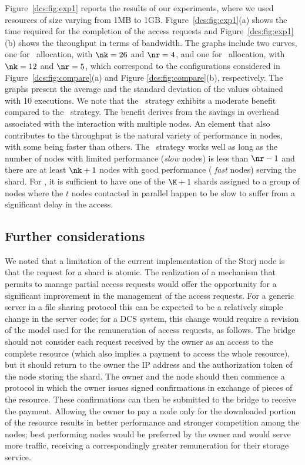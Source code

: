 {Figure~\ref{dcs:fig:exp1} reports the results of our experiments, where we
used resources of size varying from 1MB to 1GB.
Figure~\ref{dcs:fig:exp1}(a) shows the time required for the completion of
the access requests and Figure~\ref{dcs:fig:exp1}(b) shows the throughput
in terms of bandwidth. The graphs include two curves, one for
\diagonal\ allocation, with $\nk=26$ and $\nr=4$, and one for
\compact\ allocation, with $\nk=12$ and $\nr=5$, which correspond to
the configurations considered in Figure~\ref{dcs:fig:compare}(a) and
Figure \ref{dcs:fig:compare}(b), respectively.  The graphs present the
average and the standard deviation of the values obtained with 10
executions. We note that the \compact\ strategy exhibits a moderate
benefit compared to the \diagonal\ strategy. The benefit derives from
the savings in overhead associated with the interaction with multiple
nodes. An element that also contributes to the throughput is the
natural variety of performance in nodes, with some being faster than
others.  The \compact\ strategy works well as long as the number of
nodes with limited performance ({\em slow} nodes) is less than $\nr
-1$ and there are at least $\nk +1$ nodes with good performance ({\em
  fast} nodes) serving the shard. For \diagonal, it is sufficient to
have one of the $\K+1$ shards assigned to a group of nodes where the
$t$ nodes contacted in parallel happen to be slow to suffer from a
significant delay in the access.


\subsection{Further considerations \label{dcs:ss:further}}
 We noted that a limitation of the current implementation of the Storj
 node is that the request for a shard is atomic. The realization of a
 mechanism that permits to manage partial access requests would offer
 the opportunity for a significant improvement in the management of
 the access requests. For a generic server in a file sharing protocol
 this can be expected to be a relatively simple change in the server
 code; for a DCS system, this change would require a revision of the
 model used for the remuneration of access requests, as follows.  The
 bridge should not consider each request received by the owner as an
 access to the complete resource (which also implies a payment to
 access the whole resource), but it should return to the owner the IP
 address and the authorization token of the node storing the
 shard. The owner and the node should then commence a protocol in
 which the owner issues signed confirmations in exchange of pieces of
 the resource. These confirmations can then be submitted to the bridge
 to receive the payment.  Allowing the owner to pay a node only for
 the downloaded portion of the resource results in better performance
 and stronger competition among the nodes; best performing nodes would
 be preferred by the owner and would serve more traffic, receiving a
 correspondingly greater remuneration for their storage service.
 
}
